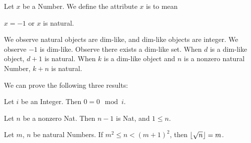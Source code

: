 \documentclass{article}
\begin{document}
\begin{definition}
Let $x$ be a Number. We define the attribute $x$ is  to
mean
\begin{defn}
\item $x=-1$ or $x$ is natural.
\end{defn}
\end{definition}

We observe natural objects are dim-like, and dim-like objects are integer.
We observe $-1$ is dim-like.
Observe there exists a dim-like set.
When $d$ is a dim-like object, $d+1$ is natural.
When $k$ is a dim-like object and $n$ is a nonzero natural Number, $k+n$
is natural.

We can prove the following three results:
\begin{thm}
\item\label{int1:73} Let $i$ be an Integer. Then $0=0\mod{i}$.
\item\label{int1:74} Let $n$ be a nonzero Nat. Then $n-1$ is Nat, and
  $1\leq n$.
\item\label{int1:75} Let $m$, $n$ be natural Numbers.
  If $m^{2}\leq n < (m+1)^{2}$, then $\lfloor \sqrt{n} \rfloor=m$.
\end{thm}
\end{document}
